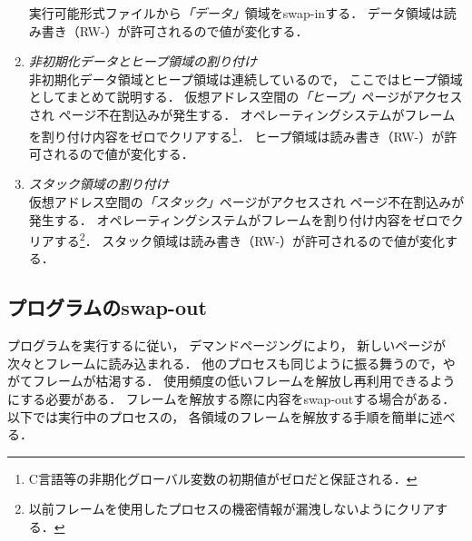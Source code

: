 \begin{enumerate}
  実行可能形式ファイルから\emph{「データ」}領域をswap-inする．
  データ領域は読み書き（RW-）が許可されるので値が変化する．
\item \emph{非初期化データとヒープ領域の割り付け} \\
  非初期化データ領域とヒープ領域は連続しているので，
  ここではヒープ領域としてまとめて説明する．
  仮想アドレス空間の\emph{「ヒープ」}ページがアクセスされ
  ページ不在割込みが発生する．
  オペレーティングシステムがフレームを割り付け内容をゼロでクリアする\footnote{
  C言語等の非期化グローバル変数の初期値がゼロだと保証される．}．
  ヒープ領域は読み書き（RW-）が許可されるので値が変化する．
\item \emph{スタック領域の割り付け} \\
  仮想アドレス空間の\emph{「スタック」}ページがアクセスされ
  ページ不在割込みが発生する．
  オペレーティングシステムがフレームを割り付け内容をゼロでクリアする\footnote{
  以前フレームを使用したプロセスの機密情報が漏洩しないようにクリアする．}．
  スタック領域は読み書き（RW-）が許可されるので値が変化する．
\end{enumerate}

\subsection{プログラムのswap-out}
プログラムを実行するに従い，
デマンドページングにより，
新しいページが次々とフレームに読み込まれる．
他のプロセスも同じように振る舞うので，やがてフレームが枯渇する．
使用頻度の低いフレームを解放し再利用できるようにする必要がある．
フレームを解放する際に内容をswap-outする場合がある．
以下では実行中のプロセスの，
各領域のフレームを解放する手順を簡単に述べる．

